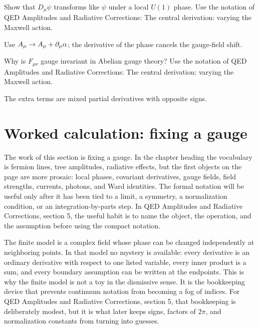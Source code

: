 \begin{exercise}
Show that \(D_\mu\psi\) transforms like \(\psi\) under a local \(U(1)\) phase.  Use the notation of QED Amplitudes and Radiative Corrections: The central derivation: varying the Maxwell action.
\begin{answer}
Use \(A_\mu\to A_\mu+\partial_\mu\alpha\); the derivative of the phase cancels the gauge-field shift.
\end{answer}
\end{exercise}

\begin{exercise}
Why is \(F_{\mu\nu}\) gauge invariant in Abelian gauge theory?  Use the notation of QED Amplitudes and Radiative Corrections: The central derivation: varying the Maxwell action.
\begin{answer}
The extra terms are mixed partial derivatives with opposite signs.
\end{answer}
\end{exercise}



\section{Worked calculation: fixing a gauge}

The work of this section is fixing a gauge.  In the chapter heading the vocabulary is fermion lines, tree amplitudes, radiative effects, but the first objects on the page are more prosaic: local phases, covariant derivatives, gauge fields, field strengths, currents, photons, and Ward identities.  The formal notation will be useful only after it has been tied to a limit, a symmetry, a normalization condition, or an integration-by-parts step.  In QED Amplitudes and Radiative Corrections, section 5, the useful habit is to name the object, the operation, and the assumption before using the compact notation.

The finite model is a complex field whose phase can be changed independently at neighboring points.  In that model no mystery is available: every derivative is an ordinary derivative with respect to one listed variable, every inner product is a sum, and every boundary assumption can be written at the endpoints.  This is why the finite model is not a toy in the dismissive sense.  It is the bookkeeping device that prevents continuum notation from becoming a fog of indices.  For QED Amplitudes and Radiative Corrections, section 5, that bookkeeping is deliberately modest, but it is what later keeps signs, factors of \(2\pi\), and normalization constants from turning into guesses.

